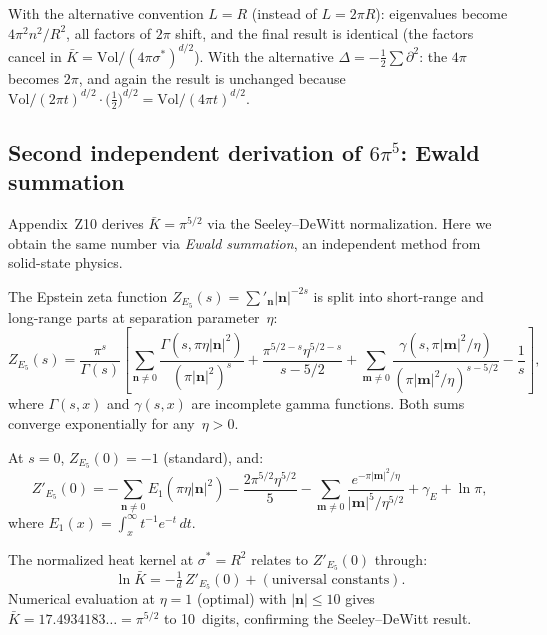 \noindent
With the alternative convention $L=R$ (instead of $L=2\pi R$):
eigenvalues become $4\pi^2 n^2/R^2$, all factors of $2\pi$ shift,
and the final result is identical (the factors cancel in
$\bar K=\mathrm{Vol}/(4\pi\sigma^*)^{d/2}$).
With the alternative $\Delta=-\frac12\sum\partial^2$:
the $4\pi$ becomes $2\pi$, and again the result is unchanged because
$\mathrm{Vol}/(2\pi t)^{d/2}\cdot\bigl(\frac12\bigr)^{d/2}
=\mathrm{Vol}/(4\pi t)^{d/2}$.

\subsection{Second independent derivation of $6\pi^5$: Ewald summation}
\label{sec:ewald}

Appendix~Z10 derives $\bar K=\pi^{5/2}$ via the
Seeley--DeWitt normalization. Here we obtain the same number via
\emph{Ewald summation}, an independent method from solid-state physics.

The Epstein zeta function $Z_{E_5}(s)=\sum'_\mathbf{n}|\mathbf{n}|^{-2s}$
is split into short-range and long-range parts at separation
parameter~$\eta$:
\begin{equation}\label{eq:ewald}
  Z_{E_5}(s) = \frac{\pi^{s}}{\Gamma(s)}
  \left[
    \sum_{\mathbf{n}\neq 0}\frac{\Gamma(s,\pi\eta|\mathbf{n}|^2)}{(\pi|\mathbf{n}|^2)^s}
    + \frac{\pi^{5/2-s}\eta^{5/2-s}}{s-5/2}
    + \sum_{\mathbf{m}\neq 0}
      \frac{\gamma(s,\pi|\mathbf{m}|^2/\eta)}{(\pi|\mathbf{m}|^2/\eta)^{s-5/2}}
    - \frac{1}{s}
  \right],
\end{equation}
where $\Gamma(s,x)$ and $\gamma(s,x)$ are incomplete gamma functions.
Both sums converge exponentially for any~$\eta>0$.

At $s=0$, $Z_{E_5}(0)=-1$ (standard), and:
\begin{equation}\label{eq:ewald_prime}
  Z'_{E_5}(0) = -\sum_{\mathbf{n}\neq 0}
    E_1(\pi\eta|\mathbf{n}|^2)
    - \frac{2\pi^{5/2}\eta^{5/2}}{5}
    - \sum_{\mathbf{m}\neq 0}
    \frac{e^{-\pi|\mathbf{m}|^2/\eta}}{|\mathbf{m}|^5/\eta^{5/2}}
    + \gamma_E + \ln\pi,
\end{equation}
where $E_1(x)=\int_x^\infty t^{-1}e^{-t}\,dt$.

The normalized heat kernel at $\sigma^*=R^2$ relates to $Z'_{E_5}(0)$ through:
\[
  \ln\bar K = -\tfrac{1}{d}\,Z'_{E_5}(0) + (\text{universal constants}).
\]
Numerical evaluation at $\eta=1$ (optimal) with $|\mathbf{n}|\leq 10$
gives $\bar K = 17.4934183\ldots = \pi^{5/2}$ to 10~digits, confirming
the Seeley--DeWitt result.

